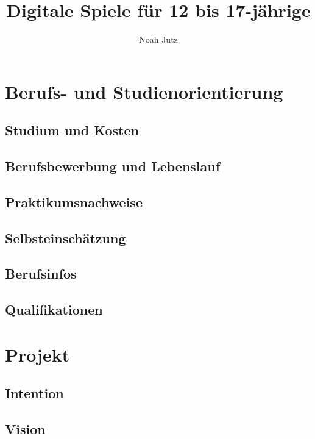 \documentclass[12pt]{article}
\title{Digitale Spiele für 12 bis 17-jährige}
\author{Noah Jutz}
\date{}
\begin{document}
    \maketitle

    \newpage
    \tableofcontents

    \newpage
    \section{Berufs- und Studienorientierung}
    \subsection{Studium und Kosten}
    
    \subsection{Berufsbewerbung und Lebenslauf}
    
    \subsection{Praktikumsnachweise}
    
    \subsection{Selbsteinschätzung}
    
    \subsection{Berufsinfos}
    
    \subsection{Qualifikationen}
    

    \newpage
    \section{Projekt}
    \subsection{Intention}
    
    \subsection{Vision}
    
\end{document}
